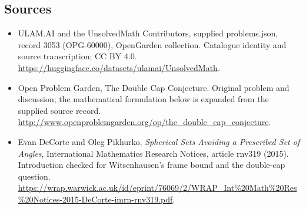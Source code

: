 \documentclass[11pt,a4paper]{article}
\begin{document}
\subsection{Sources}
\begin{itemize}
\item[S1] ULAM.AI and the UnsolvedMath Contributors, supplied problems.json, record 3053 (OPG-60000), OpenGarden collection. Catalogue identity and source transcription; CC BY 4.0.
\url{https://huggingface.co/datasets/ulamai/UnsolvedMath}.
\item[S2] Open Problem Garden, The Double Cap Conjecture. Original problem and discussion; the mathematical formulation below is expanded from the supplied source record.
\url{http://www.openproblemgarden.org/op/the_double_cap_conjecture}.

\item[R1] Evan DeCorte and Oleg Pikhurko, \emph{Spherical Sets
Avoiding a Prescribed Set of Angles}, International Mathematics
Research Notices, article rnv319 (2015). Introduction checked
for Witsenhausen's frame bound and the double-cap question.
\url{https://wrap.warwick.ac.uk/id/eprint/76069/2/WRAP_Int%20Math%20Res%20Notices-2015-DeCorte-imrn-rnv319.pdf}.

\end{itemize}
\end{document}
